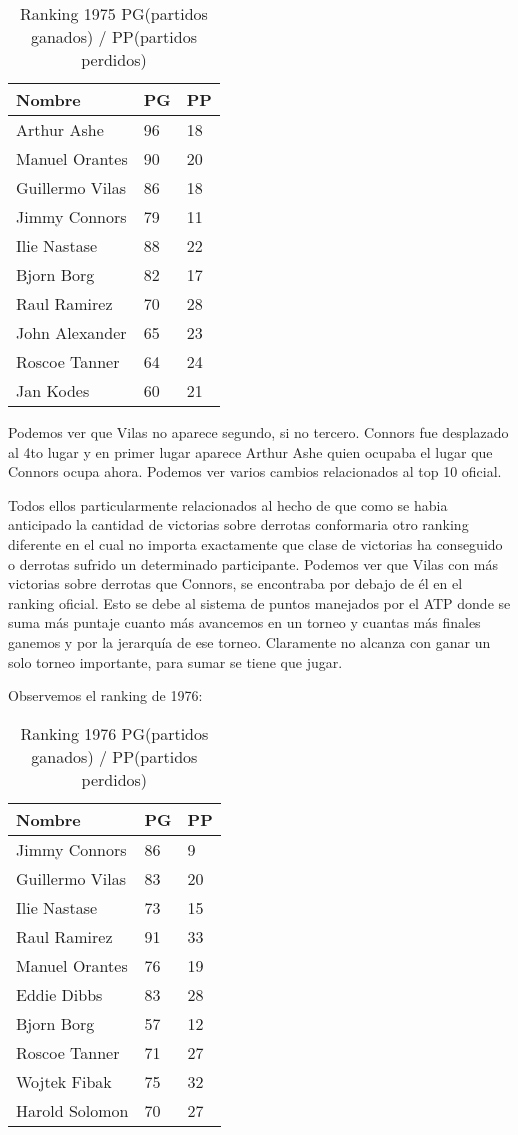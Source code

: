 \begin{table}[H]
\label{my-label}
\begin{tabular}{lll}
\hline
Nombre  & PG & PP \\ \hline
Arthur Ashe & 96 & 18 \\
Manuel Orantes & 90 & 20 \\
Guillermo Vilas & 86 & 18 \\
Jimmy Connors & 79 & 11 \\
Ilie Nastase & 88 & 22 \\
Bjorn Borg & 82 & 17 \\
Raul Ramirez & 70 & 28 \\
John Alexander & 65 & 23 \\
Roscoe Tanner & 64 & 24 \\
Jan Kodes & 60 & 21 \\ \hline 
\end{tabular}
\centering
\caption{Ranking 1975 PG(partidos ganados) / PP(partidos perdidos)}
\end{table}

Podemos ver que Vilas no aparece segundo, si no tercero. Connors fue desplazado al 4to lugar y en primer lugar aparece Arthur Ashe quien ocupaba el lugar que Connors ocupa ahora. Podemos ver varios cambios relacionados al top 10 oficial.

Todos ellos particularmente relacionados al hecho de que como se habia anticipado la cantidad de victorias sobre derrotas conformaria otro ranking diferente en el cual no importa exactamente que clase de victorias ha conseguido o derrotas sufrido un determinado participante. Podemos ver que Vilas con más victorias sobre derrotas que Connors, se encontraba por debajo de él en el ranking oficial. Esto se debe al sistema de puntos manejados por el ATP donde se suma más puntaje cuanto más avancemos en un torneo y cuantas más finales ganemos y por la jerarquía de ese torneo. Claramente no alcanza con ganar un solo torneo importante, para sumar se tiene que jugar.

Observemos el ranking de 1976:

\begin{table}[H]
\label{my-label}
\begin{tabular}{lll}
\hline
Nombre & PG & PP \\ \hline
Jimmy Connors & 86 & 9 \\
Guillermo Vilas & 83 & 20 \\
Ilie Nastase & 73 & 15 \\
Raul Ramirez & 91 & 33 \\
Manuel Orantes & 76 & 19 \\
Eddie Dibbs  & 83 & 28 \\
Bjorn Borg  & 57 & 12 \\
Roscoe Tanner & 71 & 27 \\
Wojtek Fibak & 75 & 32 \\
Harold Solomon & 70 & 27 \\ \hline 
\end{tabular}
\centering
\caption{Ranking 1976 PG(partidos ganados) / PP(partidos perdidos)}
\end{table}

